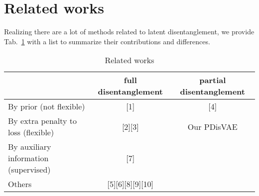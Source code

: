 \section{Related works}
\label{appendix:related_works}
Realizing there are a lot of methods related to latent disentanglement, we provide Tab.~\ref{tab:related_works} with a list to summarize their contributions and differences.

\begin{table}[!ht]
    \centering
    \caption{Related works}
    \begin{tabular}{lcc}
        \toprule
         & full disentanglement & partial disentanglement \\
        \midrule
        By prior (not flexible) & [1] & [4] \\
        By extra penalty to loss (flexible) & [2][3] & Our PDisVAE \\
        By auxiliary information (supervised) & [7] & \\
        Others & [5][6][8][9][10] & \\
        \bottomrule
    \end{tabular}
    \label{tab:related_works}
\end{table}

